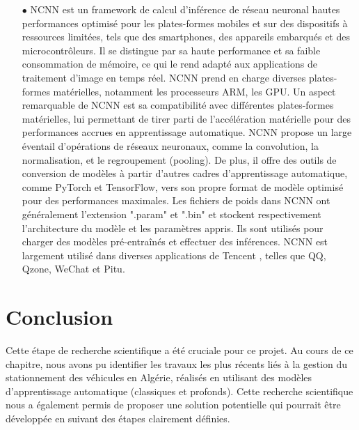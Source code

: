 \begin{itemize}
    \item [$\bullet$] NCNN est un framework de calcul d'inférence de réseau neuronal hautes performances optimisé pour les plates-formes mobiles et sur des dispositifs à ressources limitées, tels que des smartphones, des appareils embarqués et des microcontrôleurs. Il se distingue par sa haute performance et sa faible consommation de mémoire, ce qui le rend adapté aux applications de traitement d'image en temps réel. NCNN prend en charge diverses plates-formes matérielles, notamment les processeurs ARM, les GPU. Un aspect remarquable de NCNN est sa compatibilité avec différentes plates-formes matérielles, lui permettant de tirer parti de l'accélération matérielle pour des performances accrues en apprentissage automatique. NCNN propose un large éventail d'opérations de réseaux neuronaux, comme la convolution, la normalisation, et le regroupement (pooling). De plus, il offre des outils de conversion de modèles à partir d'autres cadres d'apprentissage automatique, comme PyTorch et TensorFlow, vers son propre format de modèle optimisé pour des performances maximales. Les fichiers de poids dans NCNN ont généralement l'extension ".param" et ".bin" et stockent respectivement l'architecture du modèle et les paramètres appris. Ils sont utilisés pour charger des modèles pré-entraînés et effectuer des inférences. NCNN est largement utilisé dans diverses applications de Tencent \cite{ch2_GitHubTe84}, telles que QQ, Qzone, WeChat et Pitu.
\end{itemize}

 \section{Conclusion}

Cette étape de recherche scientifique a été cruciale pour ce projet. Au cours de ce chapitre, nous avons pu identifier les travaux les plus récents liés à la gestion du stationnement des véhicules en Algérie, réalisés en utilisant des modèles d'apprentissage automatique (classiques et profonds). Cette recherche scientifique nous a également permis de proposer une solution potentielle qui pourrait être développée en suivant des étapes clairement définies.
